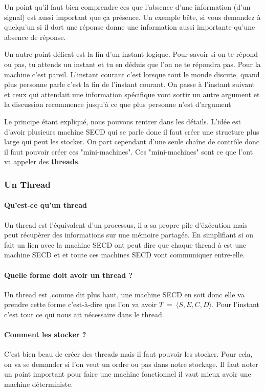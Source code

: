 \documentclass[10pt,a4paper]{article}
\begin{document}
				Un point qu'il faut bien comprendre ces que l'absence d'une information (d'un signal) est aussi important que ça présence. Un exemple bête, si vous demandez à quelqu'un si il dort une réponse donne une information aussi importante qu'une absence de réponse.
				\medbreak
				
				Un autre point délicat est la fin d'un instant logique. Pour savoir si on te répond ou pas, tu attends un instant et tu en déduis que l'on ne te répondra pas. Pour la machine c'est pareil. L'instant courant c'est lorsque tout le monde discute, quand plus personne parle c'est la fin de l'instant courant. On passe à l'instant suivant et ceux qui attendait une information spécifique vont sortir un autre argument et la discussion recommence jusqu'à ce que plus personne n'est d'argument
				\medbreak
				
				Le principe étant expliqué, nous pouvons rentrer dans les détails. L'idée est d'avoir plusieurs machine SECD qui se parle donc il faut créer une structure plus large qui peut les stocker. On part cependant d'une seule chaîne de contrôle donc il faut pouvoir créer ces "mini-machines". Ces "mini-machines" sont ce que l'ont va appeler des \textbf{threads}.
				\bigbreak
				
				
				\subsubsection{Un Thread}
					
					\paragraph{Qu'est-ce qu'un thread}
					Un thread est l'équivalent d'un processus, il a sa propre pile d'éxécution mais peut récupèrer des informations sur une mémoire partagée. En simplifiant si on fait un lien avec la machine SECD ont peut dire que chaque thread à est une machine SECD et et toute ces machines SECD vont communiquer entre-elle.
					
					\paragraph{Quelle forme doit avoir un thread ?} 
					Un thread est ,comme dit plus haut, une machine SECD en soit donc elle va prendre cette forme c'est-à-dire que l'on va avoir $T~=~\langle S,E,C,D\rangle$. Pour l'instant c'est tout ce qui nous ait nécessaire dans le thread.
					
					\paragraph{Comment les stocker ?}
					C'est bien beau de créer des threads mais il faut pouvoir les stocker. Pour cela, on va se demander si l'on veut un ordre ou pas dans notre stockage. Il faut noter un point important pour faire une machine fonctionnel il vaut mieux avoir une machine déterministe.
					\medbreak
					
\end{document}
